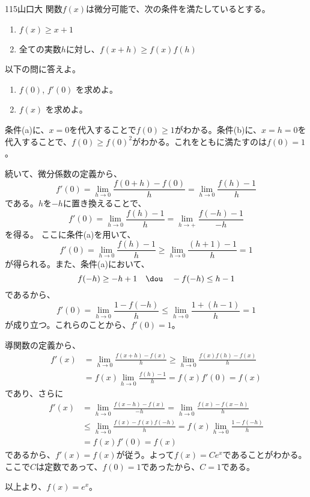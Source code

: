 \begin{thm}{115}{}{山口大}
 関数$f(x)$は微分可能で、次の条件を満たしているとする。
 \begin{enumerate}
  \renewcommand{\labelenumi}{(\alph{enumi})}
  \item $f(x)\ge x+1$
  \item 全ての実数$h$に対し、$f(x+h)\ge f(x)f(h)$
 \end{enumerate}
 以下の問に答えよ。
 \begin{enumerate}
  \item $f(0)$, $f'(0)$ を求めよ。
  \item $f(x)$ を求めよ。
 \end{enumerate}
\end{thm}

条件(a)に、$x=0$を代入することで$f(0)\ge 1$がわかる。条件(b)に、$x=h=0$を代入することで、$f(0)\ge f(0)^2$がわかる。これをともに満たすのは$f(0)=1$。

続いて、微分係数の定義から、
\[ f'(0) = \lim_{h\to 0} \frac{f(0+h)-f(0)}{h} = \lim_{h\to 0}\frac{f(h)-1}{h} \]
である。$h$を$-h$に置き換えることで、
\[ f'(0) = \lim_{h\to 0} \frac{f(h)-1}{h} = \lim_{h\to +} \frac{f(-h)-1}{-h} \]
を得る。
ここに条件(a)を用いて、
\[ f'(0) = \lim_{h\to 0}\frac{f(h)-1}{h} \ge \lim_{h\to 0}\frac{(h+1)-1}{h} = 1 \]
が得られる。また、条件(a)において、
\[ f(-h)\ge -h+1 \quad\dou\quad -f(-h)\le h-1 \]
であるから、
\[ f'(0) = \lim_{h\to 0} \frac{1-f(-h)}{h} \le \lim_{h\to 0} \frac{1+(h-1)}{h} = 1 \]
が成り立つ。これらのことから、$f'(0) = 1$。

導関数の定義から、
\begin{align*}
 f'(x) &= \lim_{h\to 0} \frac{f(x+h)-f(x)}{h}\ge \lim_{h\to 0} \frac{f(x)f(h)-f(x)}{h} \\
 &= f(x) \lim_{h\to 0} \frac{f(h)-1}{h} = f(x)f'(0) = f(x)
\end{align*}
であり、さらに
\begin{align*}
 f'(x) &= \lim_{h\to 0} \frac{f(x-h)-f(x)}{-h}=\lim_{h\to 0}\frac{f(x)-f(x-h)}{h} \\
 &\le \lim_{h\to 0} \frac{f(x)-f(x)f(-h)}{h} = f(x)\lim_{h\to 0}\frac{1-f(-h)}{h} \\
 &= f(x)f'(0)=f(x)
\end{align*}
であるから、$f'(x)=f(x)$が従う。よって$f(x)=Ce^x$であることがわかる。ここで$C$は定数であって、$f(0)=1$であったから、$C=1$である。

以上より、$f(x)=e^x$。

